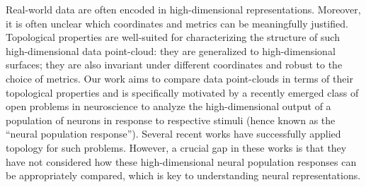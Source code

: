 \documentclass[11pt]{article}
\begin{document}
\maketitle
\vspace{-0.6in}
%
Real-world data are often encoded in high-dimensional representations. Moreover, it is often unclear which coordinates and metrics can be meaningfully justified. Topological properties are well-suited for characterizing the structure of such high-dimensional data point-cloud: they are generalized to high-dimensional surfaces; they are also invariant under different coordinates and robust to the choice of metrics. Our work aims to compare data point-clouds in terms of their topological properties and is specifically motivated by a recently emerged class of open problems in neuroscience to analyze the high-dimensional output of a population of neurons in response to respective stimuli (hence known as the “neural population response”). Several recent works have successfully applied topology for such problems. However, a crucial gap in these works is that they have not considered how these high-dimensional neural population responses can be appropriately compared, which is key to understanding neural representations.
\end{document}
